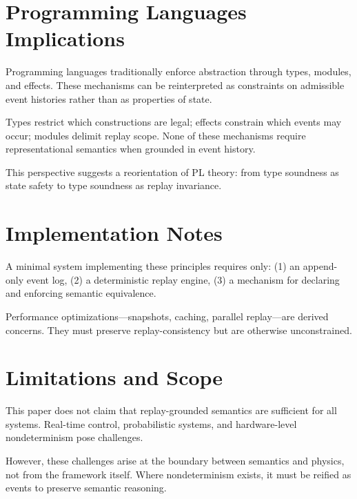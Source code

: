 \documentclass[11pt]{article}
\begin{document}
\section{Programming Languages Implications}

Programming languages traditionally enforce abstraction through types, modules, and effects. These mechanisms can be reinterpreted as constraints on admissible event histories rather than as properties of state.

Types restrict which constructions are legal; effects constrain which events may occur; modules delimit replay scope. None of these mechanisms require representational semantics when grounded in event history.

This perspective suggests a reorientation of PL theory: from type soundness as state safety to type soundness as replay invariance.

\section{Implementation Notes}

A minimal system implementing these principles requires only:
(1) an append-only event log,
(2) a deterministic replay engine,
(3) a mechanism for declaring and enforcing semantic equivalence.

Performance optimizations—snapshots, caching, parallel replay—are derived concerns. They must preserve replay-consistency but are otherwise unconstrained.

\section{Limitations and Scope}

This paper does not claim that replay-grounded semantics are sufficient for all systems. Real-time control, probabilistic systems, and hardware-level nondeterminism pose challenges.

However, these challenges arise at the boundary between semantics and physics, not from the framework itself. Where nondeterminism exists, it must be reified as events to preserve semantic reasoning.
\end{document}
